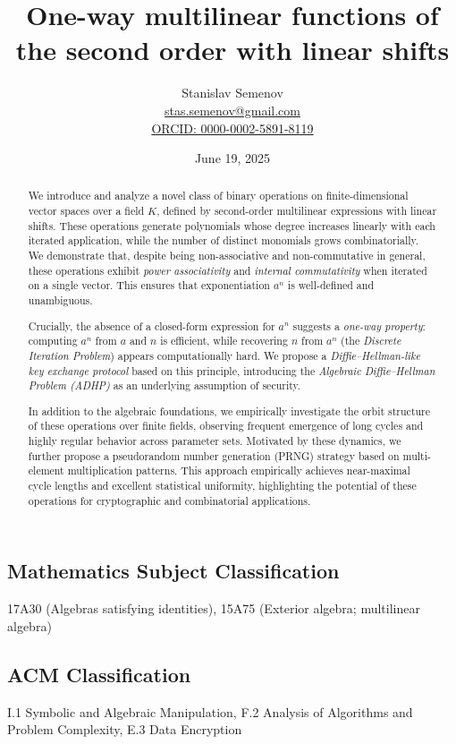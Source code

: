 \documentclass[12pt]{article}
\title{One-way multilinear functions of the second order with linear shifts}
\author{Stanislav Semenov \\
\href{mailto:stas.semenov@gmail.com}{stas.semenov@gmail.com} \\
\href{https://orcid.org/0000-0002-5891-8119}{ORCID: 0000-0002-5891-8119}}
\date{June 19, 2025}
\theoremstyle{definition}
\theoremstyle{plain}
\theoremstyle{remark}
\begin{document}
\maketitle

\begin{abstract}
We introduce and analyze a novel class of binary operations on finite-dimensional vector spaces over a field \( K \), defined by second-order multilinear expressions with linear shifts. These operations generate polynomials whose degree increases linearly with each iterated application, while the number of distinct monomials grows combinatorially. We demonstrate that, despite being non-associative and non-commutative in general, these operations exhibit \emph{power associativity} and \emph{internal commutativity} when iterated on a single vector. This ensures that exponentiation \( a^n \) is well-defined and unambiguous.

Crucially, the absence of a closed-form expression for \( a^n \) suggests a \emph{one-way property}: computing \( a^n \) from \( a \) and \( n \) is efficient, while recovering \( n \) from \( a^n \) (the \emph{Discrete Iteration Problem}) appears computationally hard. We propose a \emph{Diffie–Hellman-like key exchange protocol} based on this principle, introducing the \emph{Algebraic Diffie–Hellman Problem (ADHP)} as an underlying assumption of security.

In addition to the algebraic foundations, we empirically investigate the orbit structure of these operations over finite fields, observing frequent emergence of long cycles and highly regular behavior across parameter sets. Motivated by these dynamics, we further propose a pseudorandom number generation (PRNG) strategy based on multi-element multiplication patterns. This approach empirically achieves near-maximal cycle lengths and excellent statistical uniformity, highlighting the potential of these operations for cryptographic and combinatorial applications.
\end{abstract}

\subsection*{Mathematics Subject Classification}
17A30 (Algebras satisfying identities), 15A75 (Exterior algebra; multilinear algebra)

\subsection*{ACM Classification}
I.1 Symbolic and Algebraic Manipulation, F.2 Analysis of Algorithms and Problem Complexity, E.3 Data Encryption
\end{document}
